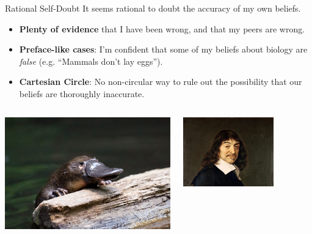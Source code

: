 \documentclass[aspectratio=169, dvipsnames]{beamer}
\begin{document}
\begin{frame}{Rational Self-Doubt}
  It seems rational to doubt the accuracy of my own beliefs.
  \begin{itemize}
  \item \textbf{Plenty of evidence} that I have been wrong, and that my peers are wrong.
  \item \textbf{Preface-like cases}: I'm confident that some of my beliefs about biology are \textit{false} (e.g. ``Mammals don't lay eggs'').
  \item \textbf{Cartesian Circle}: No non-circular way to rule out the possibility that our beliefs are thoroughly inaccurate.
  \end{itemize}
  \begin{columns}
    \begin{column}{.48\linewidth}
      \begin{center}
        \includegraphics[width=.7\textwidth]{platypus.jpg}
      \end{center}
    \end{column}
    \begin{column}{.48\linewidth}
      \begin{center}
      \includegraphics[width=0.7\textwidth]{descartes.png}
      \end{center}
    \end{column}
  \end{columns}
\end{frame}
\end{document}
